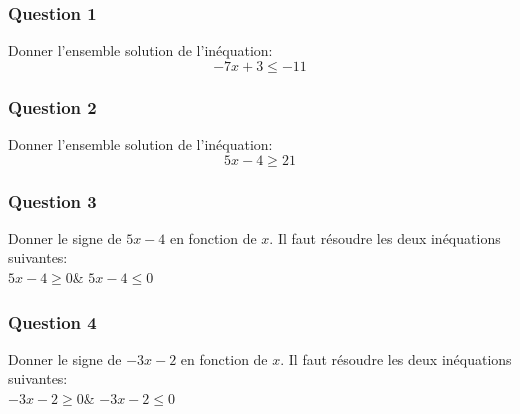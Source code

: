 \documentclass[t,12pt]{beamer}
\begin{document}
\begin{frame}
	\frametitle{Question 1}
Donner l'ensemble solution de l'inéquation:
$$-7x+3 \leq -11$$
\end{frame}

\begin{frame}
\frametitle{Question 2}
Donner l'ensemble solution de l'inéquation:
$$5x-4 \geq 21$$

\end{frame}


\begin{frame}
\frametitle{Question 3}
Donner le signe de $5x-4$ en fonction de $x$. Il faut résoudre les deux inéquations suivantes: \\[0.3cm]
\hfil$5x-4 \geq 0$\hfil\&\hfil
$5x-4 \leq 0$

\end{frame}

\begin{frame}
	\frametitle{Question 4}
Donner le signe de $-3x-2$ en fonction de $x$. Il faut résoudre les deux inéquations suivantes:\\[0.3cm]
\hfil$-3x-2 \geq 0$\hfil\&\hfil
$-3x-2 \leq 0$ 

\end{frame}
\end{document}
